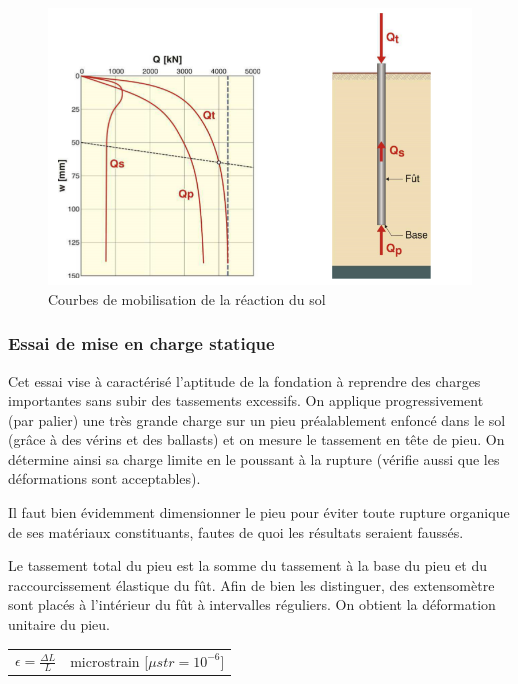         \begin{figure}[h!]
            \centering
            \includegraphics[scale=0.8]{Holeyman/images/H33}
            \caption{Courbes de mobilisation de la réaction du sol}
        \end{figure}
        
        \subsubsection{Essai de mise en charge statique}
        
        Cet essai vise à caractérisé l'aptitude de la fondation à reprendre des charges importantes sans subir des tassements excessifs. On applique progressivement (par palier) une très grande charge sur un pieu préalablement enfoncé dans le sol (grâce à des vérins et des ballasts) et on mesure le tassement en tête de pieu. On détermine ainsi sa charge limite en le poussant à la rupture (vérifie aussi que les déformations sont acceptables).
        
        Il faut bien évidemment dimensionner le pieu pour éviter toute rupture organique de ses matériaux constituants, fautes de quoi les résultats seraient faussés.
        
        Le tassement total du pieu est la somme du tassement à la base du pieu et du raccourcissement élastique du fût. Afin de bien les distinguer, des extensomètre sont placés à l'intérieur du fût à intervalles réguliers. On obtient la déformation unitaire du pieu.
        
        \begin{center}
        \begin{tabular}{cc}
            $\epsilon = \frac{\Delta L}{L}  $  & microstrain [$\mu str = 10^{-6}$]
        \end{tabular}
        \end{center} 
        
